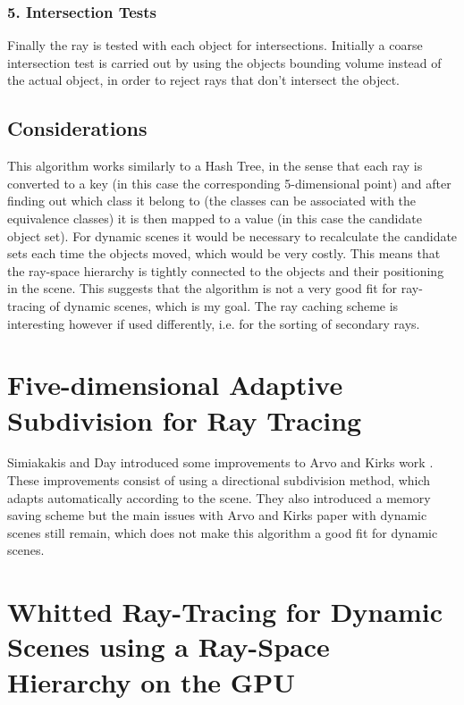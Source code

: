 \subsubsection{5. Intersection Tests}	

Finally the ray is tested with each object for intersections. Initially a coarse intersection test is carried out by using the objects bounding volume instead of the actual object, in order to reject rays that don't intersect the object.

\subsection{Considerations}

This algorithm works similarly to a Hash Tree, in the sense that each ray is converted to a key (in this case the corresponding 5-dimensional point) and after finding out which class it belong to (the classes can be associated with the equivalence classes) it is then mapped to a value (in this case the candidate object set). For dynamic scenes it would be necessary to recalculate the candidate sets each time the objects moved, which would be very costly. This means that the ray-space hierarchy is tightly connected to the objects and their positioning in the scene. This suggests that the algorithm is not a very good fit for ray-tracing of dynamic scenes, which is my goal. The ray caching scheme is interesting however if used differently, i.e. for the sorting of secondary rays.

\vfill

\section{Five-dimensional Adaptive Subdivision for Ray Tracing}
\label{section:backgroud_simiakakis94}

Simiakakis and Day \cite{Simiakakis94} introduced some improvements to Arvo and Kirks work \cite{Arvo87}. These improvements consist of using a directional subdivision method, which adapts automatically according to the scene. They also introduced a memory saving scheme but the main issues with Arvo and Kirks paper with dynamic scenes still remain, which does not make this algorithm a good fit for dynamic scenes.

\section{Whitted Ray-Tracing for Dynamic Scenes using a Ray-Space Hierarchy on the GPU}
\label{section:backgroud_roger07}

